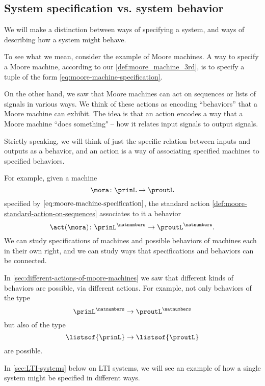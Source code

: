
\subsection{System specification vs. system behavior}

We will make a distinction between ways of specifying a system, and ways of describing how a system might behave.

To see what we mean, consider the example of Moore machines.
A way to specify a Moore machine, according to our \cref{def:moore_machine_3rd}, is to specify a tuple of the form \cref{eq:moore-machine-specification}.

On the other hand, we saw that Moore machines can act on sequences or lists of signals in various ways.
We think of these actions as encoding ``behaviors'' that a Moore machine can exhibit.
The idea is that an action encodes a way that a Moore machine ``does something" -- how it relates input signals to output signals.

Strictly speaking, we will think of just the specific relation between inputs and outputs as a behavior, and an action is a way of associating specified machines to specified behaviors.


For example, given a machine
\begin{equation}
    \mora \colon \prinL \to \proutL
\end{equation}
specified by $\cref{eq:moore-machine-specification}$, the standard action \cref{def:moore-standard-action-on-sequences} associates to it a behavior
\begin{equation}
    \act(\mora) \colon {\prinL}^\natnumbers \to {\proutL}^\natnumbers.
\end{equation}
We can study specifications of machines and possible behaviors of machines each in their own right, and we can study ways that specifications and behaviors can be connected.

In \cref{sec:different-actions-of-moore-machines} we saw that different kinds of behaviors are possible, via different actions.
For example, not only behaviors of the type
\begin{equation}
    {\prinL}
    ^\natnumbers \to {\proutL}^\natnumbers
\end{equation}
but also of the type
\begin{equation}
    \listsof{\prinL} \to \listsof{\proutL}
\end{equation}
are possible.

In \cref{sec:LTI-systems} below on LTI systems, we will see an example of how a single system might be specified in different ways.


